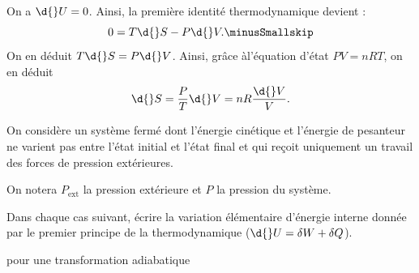 
\begin{corrige}
On a $\d{}U=0$. Ainsi, la première identité thermodynamique devient : \minusSmallskip
\[
0=T\d{}S-P\d{}V.\minusSmallskip
\]
On en déduit $T\d{}S=P\d{}V$. Ainsi, grâce àl'équation d'état $PV=nRT$, on en déduit \minusSmallskip
\[
\d{}S=\frac{P}{T}\d{}V=nR\frac{\d{}V}{V}.
\]
\end{corrige}



\finEntrainement



\newpage



\hauteurLargeurCadreReponse		{6mm}{4cm}
\initialisationEntrainement


\debutEntrainement

On considère un système fermé dont l'énergie cinétique et l'énergie de pesanteur ne varient pas entre l'état initial et l'état final et qui reçoit uniquement un travail des forces de pression extérieures. 

On notera $P_{\text{ext}}$ la pression extérieure et $P$ la pression du système.

Dans chaque cas suivant, écrire la variation élémentaire d'énergie interne donnée par le premier principe de la thermodynamique ($\d{}U=\delta W + \delta Q$).


\begin{enonce}
pour une transformation adiabatique
\end{enonce}

